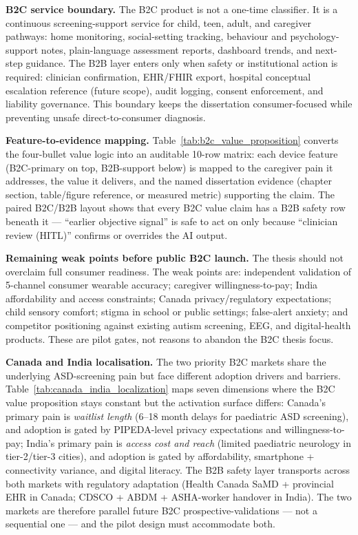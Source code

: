 \noindent\textbf{B2C service boundary.} The B2C product is not a one-time classifier. It is a continuous screening-support service for child, teen, adult, and caregiver pathways: home monitoring, social-setting tracking, behaviour and psychology-support notes, plain-language assessment reports, dashboard trends, and next-step guidance. The B2B layer enters only when safety or institutional action is required: clinician confirmation, EHR/FHIR export, hospital conceptual escalation reference (future scope), audit logging, consent enforcement, and liability governance. This boundary keeps the dissertation consumer-focused while preventing unsafe direct-to-consumer diagnosis.

\noindent\textbf{Feature-to-evidence mapping.} Table~\ref{tab:b2c_value_proposition} converts the four-bullet value logic into an auditable 10-row matrix: each device feature (B2C-primary on top, B2B-support below) is mapped to the caregiver pain it addresses, the value it delivers, and the named dissertation evidence (chapter section, table/figure reference, or measured metric) supporting the claim. The paired B2C/B2B layout shows that every B2C value claim has a B2B safety row beneath it --- ``earlier objective signal'' is safe to act on only because ``clinician review (HITL)'' confirms or overrides the AI output.



\noindent\textbf{Remaining weak points before public B2C launch.} The thesis should not overclaim full consumer readiness. The weak points are: independent validation of 5-channel consumer wearable accuracy; caregiver willingness-to-pay; India affordability and access constraints; Canada privacy/regulatory expectations; child sensory comfort; stigma in school or public settings; false-alert anxiety; and competitor positioning against existing autism screening, EEG, and digital-health products. These are pilot gates, not reasons to abandon the B2C thesis focus.

\noindent\textbf{Canada and India localisation.} The two priority B2C markets share the underlying ASD-screening pain but face different adoption drivers and barriers. Table~\ref{tab:canada_india_localization} maps seven dimensions where the B2C value proposition stays constant but the activation surface differs: Canada's primary pain is \emph{waitlist length} (6--18 month delays for paediatric ASD screening), and adoption is gated by PIPEDA-level privacy expectations and willingness-to-pay; India's primary pain is \emph{access cost and reach} (limited paediatric neurology in tier-2/tier-3 cities), and adoption is gated by affordability, smartphone + connectivity variance, and digital literacy. The B2B safety layer transports across both markets with regulatory adaptation (Health Canada SaMD + provincial EHR in Canada; CDSCO + ABDM + ASHA-worker handover in India). The two markets are therefore parallel future B2C prospective-validations --- not a sequential one --- and the pilot design must accommodate both.

